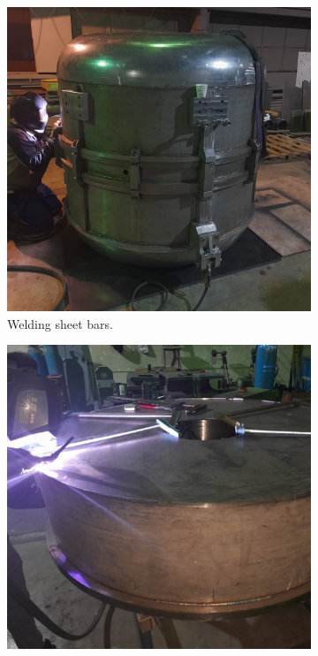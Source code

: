 \documentclass[a4paper,oneside,12pt]{report}
\numberwithin{equation}{chapter}
\begin{document}
{\iffalse \begin{figure}
    \centering
    \begin{subfigure}{.5\textwidth}
      \centering
      \includegraphics[width=.96\linewidth]{./figures/manif/welding/rhodo_assembled_welding_cropped.jpeg}
      \caption{Welding sheet bars.}
    \end{subfigure}%
    \centering
    \begin{subfigure}{.5\textwidth}
      \centering
      \includegraphics[width=.96\linewidth]{./figures/manif/welding/rhodo_middle_welding_toroidal_sheets_cropped.jpeg}

\end{subfigure}
\end{figure}}
\end{document}
